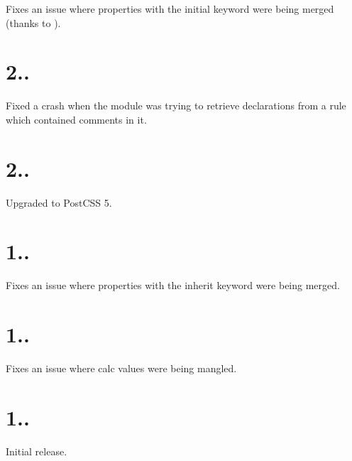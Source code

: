 
\begin{DoxyItemize}
\item Fixes an issue where properties with the {\ttfamily initial} keyword were being merged (thanks to ).
\end{DoxyItemize}

\section*{2..}


\begin{DoxyItemize}
\item Fixed a crash when the module was trying to retrieve declarations from a rule which contained comments in it.
\end{DoxyItemize}

\section*{2..}


\begin{DoxyItemize}
\item Upgraded to Post\+C\+SS 5.
\end{DoxyItemize}

\section*{1..}


\begin{DoxyItemize}
\item Fixes an issue where properties with the {\ttfamily inherit} keyword were being merged.
\end{DoxyItemize}

\section*{1..}


\begin{DoxyItemize}
\item Fixes an issue where calc values were being mangled.
\end{DoxyItemize}

\section*{1..}


\begin{DoxyItemize}
\item Initial release. 
\end{DoxyItemize}